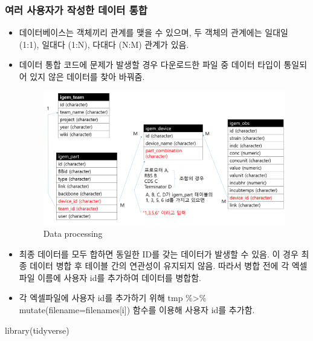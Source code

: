 \documentclass[
]{article}
\newenvironment{Shaded}{\begin{snugshade}}{\end{snugshade}}
\newcommand{\FunctionTok}[1]{\textcolor[rgb]{0.00,0.00,0.00}{#1}}
\newcommand{\NormalTok}[1]{#1}
\begin{document}
\hypertarget{uxc5ecuxb7ec-uxc0acuxc6a9uxc790uxac00-uxc791uxc131uxd55c-uxb370uxc774uxd130-uxd1b5uxd569}{%
\subsubsection{여러 사용자가 작성한 데이터
통합}\label{uxc5ecuxb7ec-uxc0acuxc6a9uxc790uxac00-uxc791uxc131uxd55c-uxb370uxc774uxd130-uxd1b5uxd569}}

\begin{itemize}
\item
  데이터베이스는 객체끼리 관계를 맺을 수 있으며, 두 객체의 관계에는
  일대일 (1:1), 일대다 (1:N), 다대다 (N:M) 관계가 있음.
\item
  데이터 통합 코드에 문제가 발생할 경우 다운로드한 파일 중 데이터 타입이
  통일되어 있지 않은 데이터를 찾아 바꿔줌.

  \begin{figure}
  \centering
  \includegraphics{_site/다운로드 (1).png}
  \caption{Data processing}
  \end{figure}
\item
  최종 데이터를 모두 합하면 동일한 ID를 갖는 데이터가 발생할 수 있음. 이
  경우 최종 데이터 병합 후 테이블 간의 연관성이 유지되지 않음. 따라서
  병합 전에 각 엑셀파일 이름에 사용자 id를 추가하여 데이터를 병합함.
\item
  각 엑셀파일에 사용자 id를 추가하기 위해 tmp \%\textgreater\%
  mutate(filename=filenames{[}i{]}) 함수를 이용해 사용자 id를 추가함.
\end{itemize}

\begin{Shaded}
\begin{Highlighting}[]
\FunctionTok{library}\NormalTok{(tidyverse)}
\end{Highlighting}
\end{Shaded}
\end{document}
